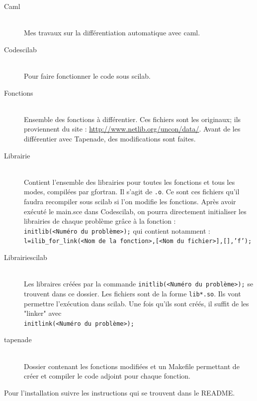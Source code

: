 \begin{description}
  \item[Caml] \hfill \\
Mes travaux sur la différentiation automatique avec caml.

  \item[Codescilab] \hfill \\
Pour faire fonctionner le code sous scilab.

  \item[Fonctions] \hfill \\
Ensemble des fonctions à différentier. Ces fichiers sont les originaux; ils proviennent du site :
\url{http://www.netlib.org/uncon/data/}. Avant de les différentier avec Tapenade, des modifications sont faites.

  \item[Librairie] \hfill \\
Contient l'ensemble des librairies pour toutes les fonctions et tous les modes, compilées par gfortran. Il
s'agit de {\tt .o}. Ce sont ces fichiers qu'il faudra recompiler sous scilab si l'on modifie les fonctions. 
Apr\`es avoir exécuté le main.sce dans Codescilab, on pourra directement initialiser les librairies de chaque
probl\`eme grâce à la fonction :\\
{\tt initlib(<Numéro du probl\`eme>);} qui contient notamment : \\
{\tt l=ilib\_for\_link(<Nom de la fonction>,[<Nom du fichier>],[],'f');}\\

  \item[Librairiescilab] \hfill \\
Les libraires créées par la commande {\tt initlib(<Numéro du probl\`eme>);}
se trouvent dans ce dossier. Les fichiers sont de la forme {\tt lib*.so}. Ils vont permettre l'exécution
dans scilab. Une fois qu'ils sont créés, il suffit de les "linker" avec \\
{\tt initlink(<Numéro du probl\`eme>);}\\

  \item[tapenade] \hfill \\
Dossier contenant les fonctions modifiées et un Makefile permettant de créer et compiler le code adjoint
pour chaque fonction.
\end{description}

Pour l'installation suivre les instructions qui se trouvent dans le README.





